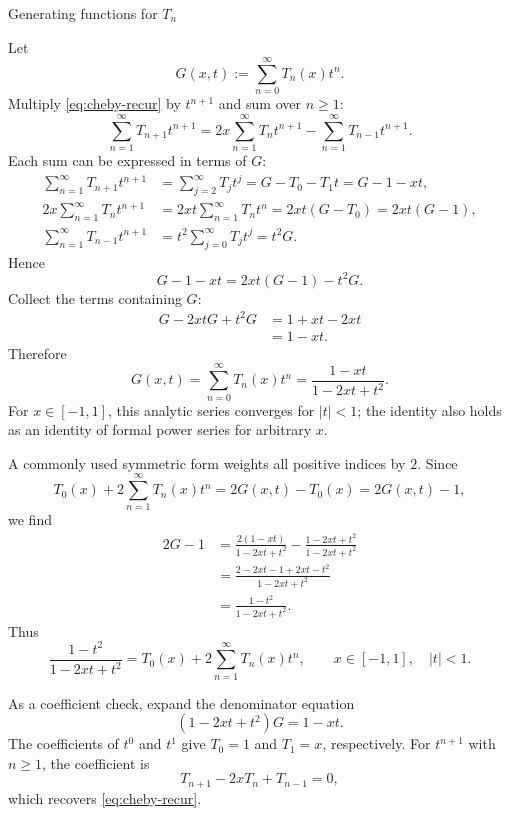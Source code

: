 \documentclass[11pt]{beamer}
\begin{document}
\begin{frame}[allowframebreaks]{Generating functions for $T_n$}
\footnotesize

Let
\[
  G(x,t):=\sum_{n=0}^{\infty}T_n(x)t^n.
\]
Multiply \eqref{eq:cheby-recur} by $t^{n+1}$ and sum over $n\ge1$:
\[
  \sum_{n=1}^{\infty}T_{n+1}t^{n+1}
    =2x\sum_{n=1}^{\infty}T_nt^{n+1}
     -\sum_{n=1}^{\infty}T_{n-1}t^{n+1}.
\]
Each sum can be expressed in terms of $G$:
\begin{align*}
  \sum_{n=1}^{\infty}T_{n+1}t^{n+1}
    &=\sum_{j=2}^{\infty}T_jt^j
      =G-T_0-T_1t
      =G-1-xt,\\
  2x\sum_{n=1}^{\infty}T_nt^{n+1}
    &=2xt\sum_{n=1}^{\infty}T_nt^n
      =2xt(G-T_0)
      =2xt(G-1),\\
  \sum_{n=1}^{\infty}T_{n-1}t^{n+1}
    &=t^2\sum_{j=0}^{\infty}T_jt^j
      =t^2G.
\end{align*}
Hence
\[
  G-1-xt=2xt(G-1)-t^2G.
\]
Collect the terms containing $G$:
\begin{align*}
  G-2xtG+t^2G
    &=1+xt-2xt\\
    &=1-xt.
\end{align*}
Therefore
\begin{equation}
  G(x,t)
    =\sum_{n=0}^{\infty}T_n(x)t^n
    =\frac{1-xt}{1-2xt+t^2}.
  \label{eq:cheby-gen-standard}
\end{equation}
For $x\in[-1,1]$, this analytic series converges for $|t|<1$; the identity
also holds as an identity of formal power series for arbitrary $x$.

A commonly used symmetric form weights all positive indices by $2$.  Since
\[
  T_0(x)+2\sum_{n=1}^{\infty}T_n(x)t^n
    =2G(x,t)-T_0(x)
    =2G(x,t)-1,
\]
we find
\begin{align*}
  2G-1
   &=
    \frac{2(1-xt)}{1-2xt+t^2}
    -\frac{1-2xt+t^2}{1-2xt+t^2}\\
   &=
    \frac{2-2xt-1+2xt-t^2}{1-2xt+t^2}\\
   &=
    \frac{1-t^2}{1-2xt+t^2}.
\end{align*}
Thus
\begin{equation}
  \frac{1-t^2}{1-2xt+t^2}
    =T_0(x)+2\sum_{n=1}^{\infty}T_n(x)t^n,
  \qquad x\in[-1,1],\quad |t|<1.
  \label{eq:cheby-gen-symmetric}
\end{equation}

As a coefficient check, expand the denominator equation
\[
  (1-2xt+t^2)G=1-xt.
\]
The coefficients of $t^0$ and $t^1$ give $T_0=1$ and $T_1=x$,
respectively.  For $t^{n+1}$ with $n\ge1$, the coefficient is
\[
  T_{n+1}-2xT_n+T_{n-1}=0,
\]
which recovers \eqref{eq:cheby-recur}.
\end{frame}
\end{document}
